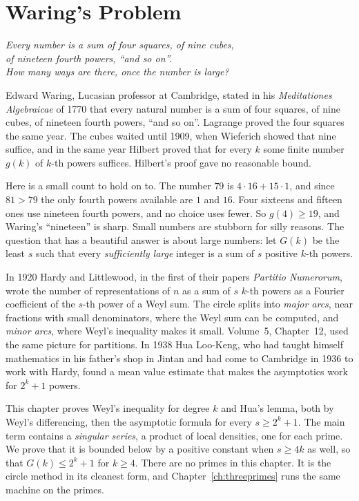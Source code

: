 \chapter{Waring's Problem}\label{ch:waring}
\begin{center}\itshape
Every number is a sum of four squares, of nine cubes,\\
of nineteen fourth powers, ``and so on''.\\
How many ways are there, once the number is large?
\end{center}

Edward Waring, Lucasian professor at Cambridge, stated in his \emph{Meditationes Algebraicae} of 1770 that every natural number is a sum of four squares, of nine cubes, of nineteen fourth powers, ``and so on''. Lagrange proved the four squares the same year. The cubes waited until 1909, when Wieferich showed that nine suffice, and in the same year Hilbert proved that for every $k$ some finite number $g(k)$ of $k$-th powers suffices. Hilbert's proof gave no reasonable bound.

Here is a small count to hold on to. The number $79$ is $4\cdot16+15\cdot1$, and since $81>79$ the only fourth powers available are $1$ and $16$. Four sixteens and fifteen ones use nineteen fourth powers, and no choice uses fewer. So $g(4)\ge19$, and Waring's ``nineteen'' is sharp. Small numbers are stubborn for silly reasons. The question that has a beautiful answer is about large numbers: let $G(k)$ be the least $s$ such that every \emph{sufficiently large} integer is a sum of $s$ positive $k$-th powers.

In 1920 Hardy and Littlewood, in the first of their papers \emph{Partitio Numerorum}, wrote the number of representations of $n$ as a sum of $s$ $k$-th powers as a Fourier coefficient of the $s$-th power of a Weyl sum. The circle splits into \emph{major arcs}, near fractions with small denominators, where the Weyl sum can be computed, and \emph{minor arcs}, where Weyl's inequality makes it small. Volume~5, Chapter~12, used the same picture for partitions. In 1938 Hua Loo-Keng, who had taught himself mathematics in his father's shop in Jintan and had come to Cambridge in 1936 to work with Hardy, found a mean value estimate that makes the asymptotics work for $2^k+1$ powers.

This chapter proves Weyl's inequality for degree $k$ and Hua's lemma, both by Weyl's differencing, then the asymptotic formula for every $s\ge 2^k+1$. The main term contains a \emph{singular series}, a product of local densities, one for each prime. We prove that it is bounded below by a positive constant when $s\ge4k$ as well, so that $G(k)\le2^k+1$ for $k\ge4$. There are no primes in this chapter. It is the circle method in its cleanest form, and Chapter~\ref{ch:threeprimes} runs the same machine on the primes.


